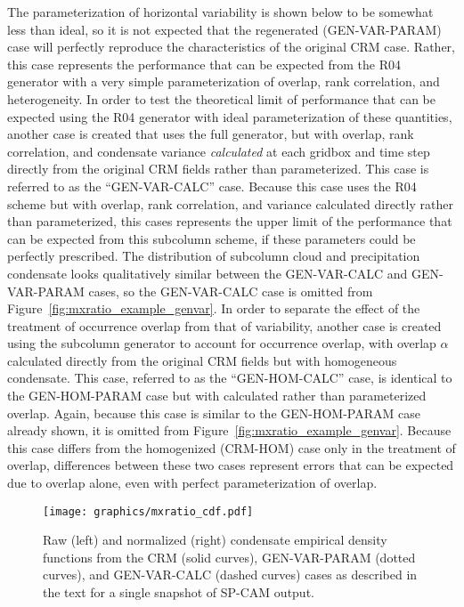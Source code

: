 The parameterization of horizontal variability is shown below to be
somewhat less than ideal, so it is not expected that the regenerated
(GEN-VAR-PARAM) case will perfectly reproduce the characteristics of the
original CRM case. Rather, this case represents the performance that can
be expected from the R04 generator with a very simple parameterization
of overlap, rank correlation, and heterogeneity. In order to test the
theoretical limit of performance that can be expected using the R04
generator with ideal parameterization of these quantities, another case
is created that uses the full generator, but with overlap, rank
correlation, and condensate variance \emph{calculated} at each gridbox
and time step directly from the original CRM fields rather than
parameterized. This case is referred to as the ``GEN-VAR-CALC'' case.
Because this case uses the R04 scheme but with overlap, rank
correlation, and variance calculated directly rather than parameterized,
this cases represents the upper limit of the performance that can be
expected from this subcolumn scheme, if these parameters could be
perfectly prescribed. The distribution of subcolumn cloud and
precipitation condensate looks qualitatively similar between the
GEN-VAR-CALC and GEN-VAR-PARAM cases, so the GEN-VAR-CALC case is
omitted from Figure~\ref{fig:mxratio_example_genvar}. In order to
separate the effect of the treatment of occurrence overlap from that of
variability, another case is created using the subcolumn generator to
account for occurrence overlap, with overlap \(\alpha\) calculated
directly from the original CRM fields but with homogeneous condensate.
This case, referred to as the ``GEN-HOM-CALC'' case, is identical to the
GEN-HOM-PARAM case but with calculated rather than parameterized
overlap. Again, because this case is similar to the GEN-HOM-PARAM case
already shown, it is omitted from
Figure~\ref{fig:mxratio_example_genvar}. Because this case differs from
the homogenized (CRM-HOM) case only in the treatment of overlap,
differences between these two cases represent errors that can be
expected due to overlap alone, even with perfect parameterization of
overlap.

\begin{figure}[tp]
\centering
\texttt{[image: graphics/mxratio\_cdf.pdf]}
\caption{\label{fig:mxratio_cdf}Raw (left) and normalized (right)
condensate empirical density functions from the CRM (solid curves),
GEN-VAR-PARAM (dotted curves), and GEN-VAR-CALC (dashed curves) cases as
described in the text for a single snapshot of SP-CAM
output.}\label{fig:mxratioux5fcdf}
\end{figure}

